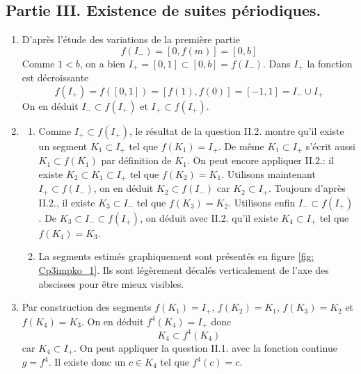 \subsection*{Partie III. Existence de suites périodiques.}
\begin{enumerate}
  \item D'après l'étude des variations de la première partie 
\begin{displaymath}
f(I_-) = [0,f(m)] = [0,b]  
\end{displaymath}
Comme $1 < b$, on a bien $I_+=[0,1]\subset [0,b]=f(I_-)$.\newline
Dans $I_+$ la fonction est décroissante
\begin{displaymath}
  f(I_+) = f([0,1]) = [f(1),f(0)] = [-1,1] = I_- \cup I_+
\end{displaymath}
On en déduit $I_- \subset f(I_+)$ et $I_+ \subset f(I_+)$.

  \item
\begin{enumerate}
  \item Comme $I_+ \subset f(I_+)$, le résultat de la question II.2. montre qu'il existe un segment $K_1\subset I_+$ tel que $f(K_1) = I_+$.\newline
  De même $K_1 \subset I_+$ s'écrit aussi $K_1 \subset f(K_1)$ par définition de $K_1$. On peut encore appliquer II.2.: il existe $K_2 \subset K_1\subset I_+$ tel que $f(K_2) = K_1$.\newline
  Utilisons maintenant $I_+ \subset f(I_-)$, on en déduit $K_2\subset f(I_-)$ car $K_2\subset I_+$. Toujours d'après II.2., il existe $K_3\subset I_-$ tel que $f(K_3)=K_2$.\newline
  Utilisons enfin $I_-\subset f(I_+)$. De $K_3\subset I_- \subset f(I_+)$, on déduit avec II.2. qu'il existe $K_4\subset I_+$ tel que $f(K_4) = K_3$. 
  \item La segments estimés graphiquement sont présentés en figure \ref{fig: Cp3impko_1}. Ils sont légèrement décalés verticalement de l'axe des abscisses pour être mieux visibles.
\end{enumerate}

  \item Par construction des segments $f(K_1)=I_+$, $f(K_2)=K_1$, $f(K_3)=K_2$ et $f(K_4)=K_3$. On en déduit $f^4(K_4) = I_+$ donc 
\begin{displaymath}
  K_4 \subset f^4(K_4)
\end{displaymath}
car $K_4 \subset I_+$. On peut appliquer la question II.1. avec la fonction continue $g=f^4$. Il existe donc un $c\in K_4$ tel que $f^4(c) = c$.
  

\end{enumerate}
